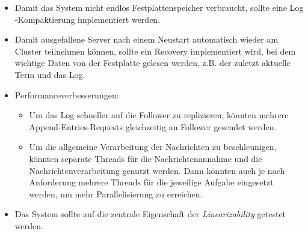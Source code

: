 \begin{itemize}
	\item Damit das System nicht endlos Festplattenspeicher verbraucht, sollte eine Log\\-Kompaktierung implementiert werden.
	\item Damit ausgefallene Server nach einem Neustart automatisch wieder am Cluster teilnehmen können, sollte ein Recovery implementiert wird, bei dem wichtige Daten von der Festplatte gelesen werden, z.B. der zuletzt aktuelle Term und das Log.
	\item Performanceverbesserungen: 
		\begin{itemize}
			\item Um das Log schneller auf die Follower zu replizieren, könnten mehrere Append-Entries-Requests gleichzeitig an Follower gesendet werden. 
			\item Um die allgemeine Verarbeitung der Nachrichten zu beschleunigen, könnten separate Threads für die Nachrichtenannahme und die Nachrichtenverarbeitung genutzt werden. Dann könnten auch je nach Anforderung mehrere Threads für die jeweilige Aufgabe eingesetzt werden, um mehr Parallelisierung zu erreichen.
		\end{itemize}
	\item Das System sollte auf die zentrale Eigenschaft der \textit{Linearizability} getestet werden.
\end{itemize}